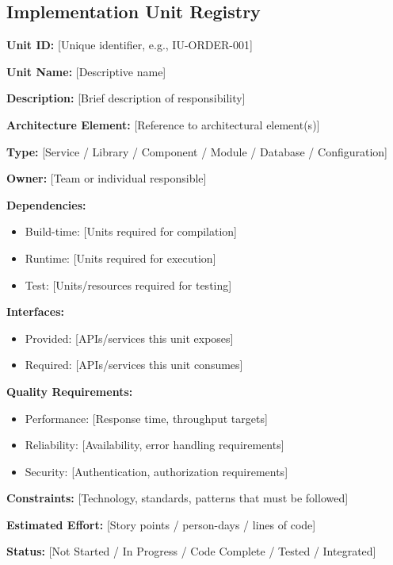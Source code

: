 \documentclass[11pt]{article}
\begin{document}
\subsection{Implementation Unit Registry}

\begin{devbox}

\textbf{Unit ID:} [Unique identifier, e.g., IU-ORDER-001]

\textbf{Unit Name:} [Descriptive name]

\textbf{Description:} [Brief description of responsibility]

\textbf{Architecture Element:} [Reference to architectural element(s)]

\textbf{Type:} [Service / Library / Component / Module / Database / Configuration]

\textbf{Owner:} [Team or individual responsible]

\textbf{Dependencies:}
\begin{itemize}[nosep]
    \item Build-time: [Units required for compilation]
    \item Runtime: [Units required for execution]
    \item Test: [Units/resources required for testing]
\end{itemize}

\textbf{Interfaces:}
\begin{itemize}[nosep]
    \item Provided: [APIs/services this unit exposes]
    \item Required: [APIs/services this unit consumes]
\end{itemize}

\textbf{Quality Requirements:}
\begin{itemize}[nosep]
    \item Performance: [Response time, throughput targets]
    \item Reliability: [Availability, error handling requirements]
    \item Security: [Authentication, authorization requirements]
\end{itemize}

\textbf{Constraints:} [Technology, standards, patterns that must be followed]

\textbf{Estimated Effort:} [Story points / person-days / lines of code]

\textbf{Status:} [Not Started / In Progress / Code Complete / Tested / Integrated]
\end{devbox}
\end{document}
